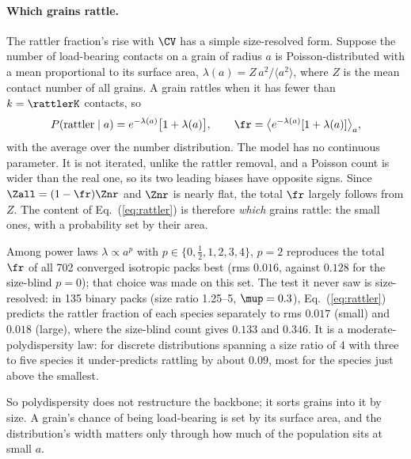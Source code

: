 
\paragraph{Which grains rattle.}
The rattler fraction's rise with $\CV$ has a simple size-resolved form.
Suppose the number of load-bearing contacts on a grain of radius $a$ is Poisson-distributed with a mean proportional
to its surface area, $\lambda(a)=Z\,a^2/\langle a^2\rangle$, where $Z$ is the mean contact number of all grains.
A grain rattles when it has fewer than $k=\rattlerK$ contacts, so
\begin{equation}
  P(\text{rattler}\mid a)=e^{-\lambda(a)}\bigl[1+\lambda(a)\bigr],
  \qquad
  \fr=\bigl\langle e^{-\lambda(a)}[1+\lambda(a)]\bigr\rangle_{a},
  \label{eq:rattler}
\end{equation}
with the average over the number distribution.
The model has no continuous parameter. It is not iterated, unlike the rattler removal, and a Poisson count is wider
than the real one, so its two leading biases have opposite signs.
Since $\Zall=(1-\fr)\Znr$ and $\Znr$ is nearly flat, the total $\fr$ largely follows from $Z$. The content of
Eq.~(\ref{eq:rattler}) is therefore \emph{which} grains rattle: the small ones, with a probability set by their area.

Among power laws $\lambda\propto a^{p}$ with $p\in\{0,\tfrac12,1,2,3,4\}$, $p=2$ reproduces the total $\fr$ of all
702 converged isotropic packs best (rms $0.016$, against $0.128$ for the size-blind $p=0$); that choice was made on
this set.
The test it never saw is size-resolved: in 135 binary packs (size ratio 1.25--5, $\mup=0.3$), Eq.~(\ref{eq:rattler})
predicts the rattler fraction of each species separately to rms $0.017$ (small) and $0.018$ (large), where the
size-blind count gives $0.133$ and $0.346$.
It is a moderate-polydispersity law: for discrete distributions spanning a size ratio of 4 with three to five
species it under-predicts rattling by about $0.09$, most for the species just above the smallest.

So polydispersity does not restructure the backbone; it sorts grains into it by size.
A grain's chance of being load-bearing is set by its surface area, and the distribution's width matters only through
how much of the population sits at small $a$.
